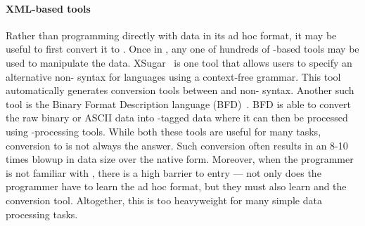



\paragraph*{XML-based tools}
Rather than programming directly with data in its ad hoc format,
it may be useful to first convert it to \xml.  Once in \xml,
any one of hundreds of \xml-based tools may be used to manipulate the data.
XSugar~\cite{brabrand+:xsugar2005} is one tool that
allows users to specify an
alternative non-\xml{} syntax for \xml{} languages using a
context-free grammar.  This tool automatically generates conversion
tools between \xml{} and non-\xml{} syntax.  Another such tool is
the Binary Format
Description language (BFD)~\cite{bfd}.  BFD is able
to convert the raw binary or ASCII 
data into \xml{}-tagged data where it can then be
processed using \xml{}-processing tools.  While both these tools are
useful for many tasks, conversion to \xml{} is not always the answer.
Such conversion often results in an 8-10 times blowup in data size
over the native form.  Moreover, when the programmer is not familiar with
\xml, there is a high barrier to entry --- not 
only does the programmer have to learn the ad hoc format, 
but they must also learn \xml{} and
the \xml{} conversion tool.  Altogether, this is too heavyweight for
many simple data processing tasks.


